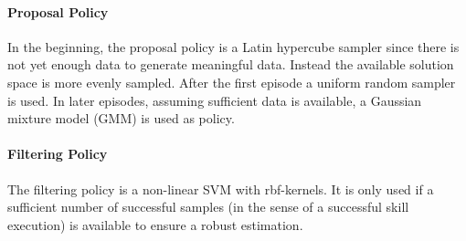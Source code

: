 \paragraph{Proposal Policy}

In the beginning, the proposal policy is a Latin hypercube sampler since there is not yet enough data to generate meaningful data.
Instead the available solution space is more evenly sampled.
After the first episode a uniform random sampler is used.
In later episodes, assuming sufficient data is available, a Gaussian mixture model (GMM) is used as policy.

\paragraph{Filtering Policy}

The filtering policy is a non-linear SVM with rbf-kernels.
It is only used if a sufficient number of successful samples (in the sense of a successful skill execution) is available to ensure a robust estimation.
